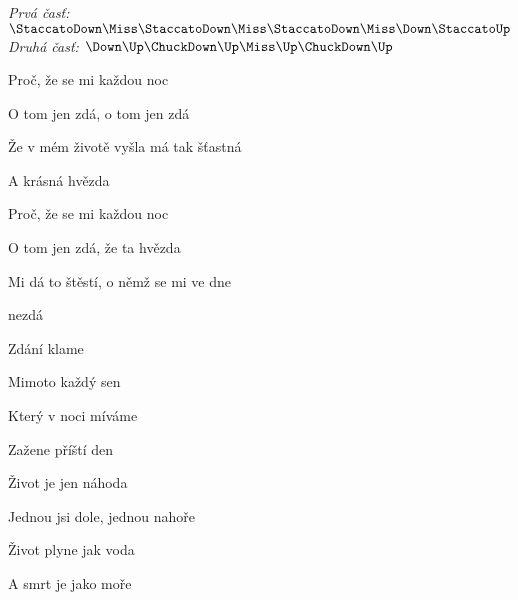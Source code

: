 \begin{song}


\begin{headerbox}
\RaiseBoxWithChucks
\textit{Prvá časť:} $\StaccatoDown\Miss\StaccatoDown\Miss\StaccatoDown\Miss\Down\StaccatoUp$ \quad
\textit{Druhá časť:} $\Down\Up\ChuckDown\Up\Miss\Up\ChuckDown\Up$
\end{headerbox}

\begin{hchordbox}
\par
{}
\end{hchordbox}

\Large

\bigskip

Proč, že se mi každou noc \par
O tom jen zdá, o tom jen zdá \par
Že v mém životě vyšla má tak šťastná \par
A krásná hvězda \par

\bigskip

Proč, že se mi každou noc \par
O tom jen zdá, že ta hvězda \par
Mi dá to štěstí, o němž se mi ve dne \par
nezdá \par

\bigskip

Zdání klame \par
Mimoto každý sen \par
Který v noci míváme \par
Zažene příští den  \par

\bigskip

Život je jen náhoda \par
{}Jednou jsi dole, jednou nahoře \par
{}Život plyne jak voda \par
A smrt je jako moře  \par


\end{song}
